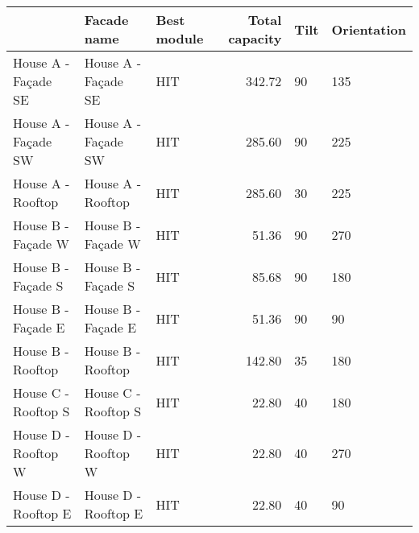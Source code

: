 \begin{tabular}{lllrll}
\toprule
{} &          Facade name & Best module &  Total capacity & Tilt & Orientation \\
\midrule
House A - Façade SE &  House A - Façade SE &         HIT &          342.72 &   90 &         135 \\
House A - Façade SW &  House A - Façade SW &         HIT &          285.60 &   90 &         225 \\
House A - Rooftop   &    House A - Rooftop &         HIT &          285.60 &   30 &         225 \\
House B - Façade W  &   House B - Façade W &         HIT &           51.36 &   90 &         270 \\
House B - Façade S  &   House B - Façade S &         HIT &           85.68 &   90 &         180 \\
House B - Façade E  &   House B - Façade E &         HIT &           51.36 &   90 &          90 \\
House B - Rooftop   &    House B - Rooftop &         HIT &          142.80 &   35 &         180 \\
House C - Rooftop S &  House C - Rooftop S &         HIT &           22.80 &   40 &         180 \\
House D - Rooftop W &  House D - Rooftop W &         HIT &           22.80 &   40 &         270 \\
House D - Rooftop E &  House D - Rooftop E &         HIT &           22.80 &   40 &          90 \\
\bottomrule
\end{tabular}

